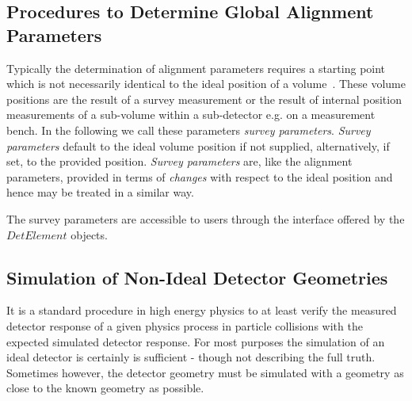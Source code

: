 \documentclass[10pt,a4paper]{article}
\begin{document}
\subsection{Procedures to Determine Global Alignment Parameters}
\label{subsect:ddalign-intro-determine-alignment-params}
\noindent
Typically the determination of alignment parameters requires a starting point
which is not necessarily identical to the ideal position of a 
volume~\cite{bib:chris-parkes-priv-comm}. These volume positions are the result
of a survey measurement or the result of internal position measurements 
of a sub-volume within a sub-detector e.g. on a measurement bench.
In the following we call these parameters {\it{survey parameters}}. 
{\it{Survey parameters}} default to the ideal volume position if not supplied,
alternatively, if set, to the provided position. {\it{Survey parameters}}
are, like the alignment parameters, provided in terms of {\it{changes}} with 
respect to the ideal position and hence may be treated in a similar way.

\noindent 
The survey parameters are accessible to users
through the interface offered by the $DetElement$ objects.

\subsection{Simulation of Non-Ideal Detector Geometries}
\label{subsect:ddalign-intro-simulate-misaligned-geometries}
\noindent
It is a standard procedure in high energy physics to at least verify 
the measured detector response of a given physics process in particle 
collisions with the expected simulated detector response.
For most purposes the simulation of an ideal detector is certainly is
sufficient - though not describing the full truth. Sometimes however, the
detector geometry must be simulated with a geometry as close to the 
known geometry as possible.
\end{document}

